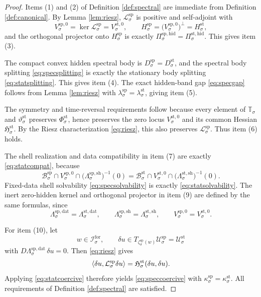 \documentclass[11pt]{article}
\newcommand{\ForSpace}[1]{\mathcal I_{#1}^{\mathrm{for}}}
\newcommand{\SpecSpace}[1]{\mathcal U_{#1}^{\mathrm{sp}}}
\newcommand{\SpecBody}[1]{\mathcal B_{#1}^{\mathrm{sp}}}
\newcommand{\SpecData}[1]{\Lambda_{#1}^{\mathrm{sp,dat}}}
\newcommand{\SpecShell}[1]{\Lambda_{#1}^{\mathrm{sp,sh}}}
\newcommand{\SpecOp}[1]{\mathcal L_{#1}^{\mathrm{sp}}}
\newcommand{\SpecZero}[1]{V_{#1}^{\mathrm{sp},0}}
\newcommand{\SpecHidden}[1]{H_{#1}^{\mathrm{sp}}}
\newcommand{\SpecHiddenBody}[1]{D_{#1}^{\mathrm{sp}}}
\newcommand{\SpecProj}[1]{\Pi_{#1}^{\mathrm{sp,hid}}}
\newcommand{\SpecEmbed}[1]{\zeta_{#1}^{\mathrm{sp}}}
\newcommand{\StatSpace}[1]{\mathcal U_{#1}^{\mathrm{st}}}
\newcommand{\StatBody}[1]{\mathcal B_{#1}^{\mathrm{st}}}
\newcommand{\StatData}[1]{\Lambda_{#1}^{\mathrm{st,dat}}}
\newcommand{\StatShell}[1]{\Lambda_{#1}^{\mathrm{st,sh}}}
\newcommand{\StatPotential}[1]{\Phi_{#1}^{\mathrm{st}}}
\newcommand{\StatZero}[1]{V_{#1}^{\mathrm{st},0}}
\newcommand{\StatHidden}[1]{H_{#1}^{\mathrm{st}}}
\newcommand{\StatHiddenBody}[1]{D_{#1}^{\mathrm{st}}}
\newcommand{\StatProj}[1]{\Pi_{#1}^{\mathrm{st,hid}}}
\newcommand{\StatHess}[1]{\mathfrak H_{#1}^{\mathrm{st}}}
\newcommand{\StatSym}[1]{\mathbb T_{#1}}
\newcommand{\StatTime}[1]{\vartheta_{#1}^{\mathrm{st}}}
\begin{document}
\begin{proof}
Items (1) and (2) of Definition \ref{def:spectral} are immediate from Definition \ref{def:canonical}. By Lemma \ref{lem:riesz}, \(\SpecOp{\sigma}\) is positive and self-adjoint with
\[
\SpecZero{\sigma}
=
\ker\SpecOp{\sigma}
=
\StatZero{\sigma},
\qquad
\SpecHidden{\sigma}
=
\bigl(\SpecZero{\sigma}\bigr)^{\perp}
=
\StatHidden{\sigma},
\]
and the orthogonal projector onto \(\SpecHidden{\sigma}\) is exactly \(\SpecProj{\sigma}=\StatProj{\sigma}\). This gives item (3).

The compact convex hidden spectral body is \(\SpecHiddenBody{\sigma}=\StatHiddenBody{\sigma}\), and the spectral body splitting \eqref{eq:specsplitting} is exactly the stationary body splitting \eqref{eq:statsplitting}. This gives item (4). The exact hidden-band gap \eqref{eq:specgap} follows from Lemma \ref{lem:riesz} with \(\lambda_{\sigma}^{\mathrm{sp}}=\lambda_{\sigma}^{\mathrm{st}}\), giving item (5).

The symmetry and time-reversal requirements follow because every element of \(\StatSym{\sigma}\) and \(\StatTime{\sigma}\) preserves \(\StatPotential{\sigma}\), hence preserves the zero locus \(\StatZero{\sigma}\) and its common Hessian \(\StatHess{\sigma}\). By the Riesz characterization \eqref{eq:riesz}, this also preserves \(\SpecOp{\sigma}\). Thus item (6) holds.

The shell realization and data compatibility in item (7) are exactly \eqref{eq:statcompat}, because
\[
\SpecBody{\sigma}\cap\SpecZero{\sigma}\cap\bigl(\SpecShell{\sigma}\bigr)^{-1}(0)
=
\StatBody{\sigma}\cap\StatZero{\sigma}\cap\bigl(\StatShell{\sigma}\bigr)^{-1}(0).
\]
Fixed-data shell solvability \eqref{eq:specsolvability} is exactly \eqref{eq:statsolvability}. The inert zero-hidden kernel and orthogonal projector in item (9) are defined by the same formulas, since
\[
\SpecData{\sigma}=\StatData{\sigma},
\qquad
\SpecShell{\sigma}=\StatShell{\sigma},
\qquad
\SpecZero{\sigma}=\StatZero{\sigma}.
\]

For item (10), let
\[
w\in\ForSpace{\sigma},
\qquad
\delta u\in T_{\SpecEmbed{\sigma}(w)}\SpecSpace{\sigma}=\StatSpace{\sigma}
\]
with \(D\SpecData{\sigma}\,\delta u=0\). Then \eqref{eq:riesz} gives
\[
\ev{\delta u,\SpecOp{\sigma}\delta u}
=
\StatHess{\sigma}(\delta u,\delta u).
\]
Applying \eqref{eq:statcoercive} therefore yields \eqref{eq:speccoercive} with \(\kappa_{\sigma}^{\mathrm{sp}}=\kappa_{\sigma}^{\mathrm{st}}\). All requirements of Definition \ref{def:spectral} are satisfied.
\end{proof}
\end{document}
